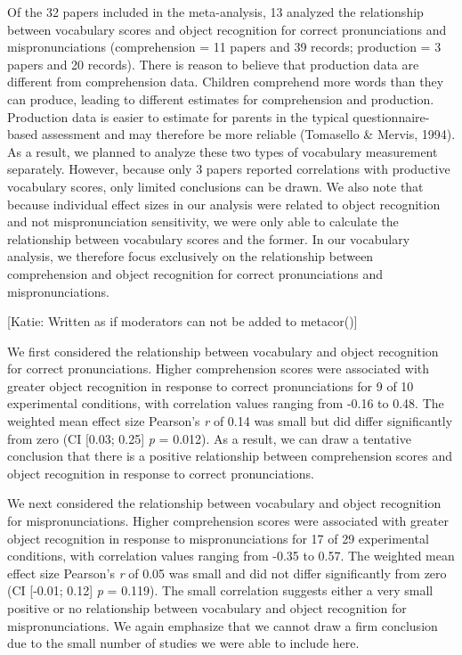 \documentclass[man]{apa6}
\theoremstyle{definition}
\theoremstyle{definition}
\theoremstyle{definition}
\theoremstyle{remark}
\begin{document}
Of the 32 papers included in the meta-analysis, 13 analyzed the
relationship between vocabulary scores and object recognition for
correct pronunciations and mispronunciations (comprehension = 11 papers
and 39 records; production = 3 papers and 20 records). There is reason
to believe that production data are different from comprehension data.
Children comprehend more words than they can produce, leading to
different estimates for comprehension and production. Production data is
easier to estimate for parents in the typical questionnaire-based
assessment and may therefore be more reliable (Tomasello \& Mervis,
1994). As a result, we planned to analyze these two types of vocabulary
measurement separately. However, because only 3 papers reported
correlations with productive vocabulary scores, only limited conclusions
can be drawn. We also note that because individual effect sizes in our
analysis were related to object recognition and not mispronunciation
sensitivity, we were only able to calculate the relationship between
vocabulary scores and the former. In our vocabulary analysis, we
therefore focus exclusively on the relationship between comprehension
and object recognition for correct pronunciations and mispronunciations.

{[}Katie: Written as if moderators can not be added to metacor(){]}

We first considered the relationship between vocabulary and object
recognition for correct pronunciations. Higher comprehension scores were
associated with greater object recognition in response to correct
pronunciations for 9 of 10 experimental conditions, with correlation
values ranging from -0.16 to 0.48. The weighted mean effect size
Pearson's \emph{r} of 0.14 was small but did differ significantly from
zero (CI {[}0.03; 0.25{]} \emph{p} = 0.012). As a result, we can draw a
tentative conclusion that there is a positive relationship between
comprehension scores and object recognition in response to correct
pronunciations.

We next considered the relationship between vocabulary and object
recognition for mispronunciations. Higher comprehension scores were
associated with greater object recognition in response to
mispronunciations for 17 of 29 experimental conditions, with correlation
values ranging from -0.35 to 0.57. The weighted mean effect size
Pearson's \emph{r} of 0.05 was small and did not differ significantly
from zero (CI {[}-0.01; 0.12{]} \emph{p} = 0.119). The small correlation
suggests either a very small positive or no relationship between
vocabulary and object recognition for mispronunciations. We again
emphasize that we cannot draw a firm conclusion due to the small number
of studies we were able to include here.
\end{document}
